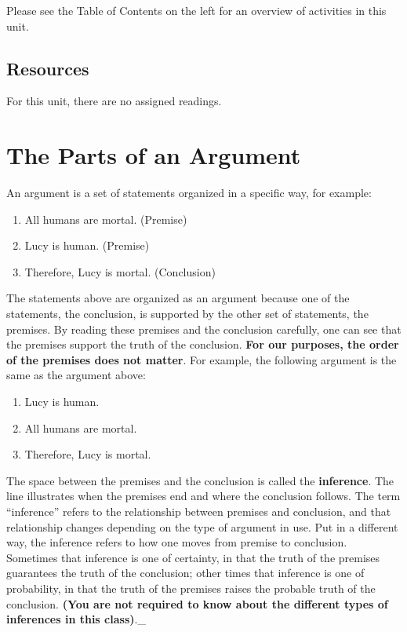 \documentclass[
]{book}
\providecommand{\tightlist}{%
  \setlength{\itemsep}{0pt}\setlength{\parskip}{0pt}}
\begin{document}
Please see the Table of Contents on the left for an overview of activities in this unit.

\hypertarget{resources-1}{%
\subsection*{Resources}\label{resources-1}}

For this unit, there are no assigned readings.

\hypertarget{the-parts-of-an-argument}{%
\section{The Parts of an Argument}\label{the-parts-of-an-argument}}

An argument is a set of statements organized in a specific way, for example:

\begin{enumerate}
\def\labelenumi{\arabic{enumi}.}
\tightlist
\item
  All humans are mortal. (Premise)\\
\item
  Lucy is human. (Premise)\\
\item
  Therefore, Lucy is mortal. (Conclusion)
\end{enumerate}

The statements above are organized as an argument because one of the statements, the conclusion, is supported by the other set of statements, the premises. By reading these premises and the conclusion carefully, one can see that the premises support the truth of the conclusion. \textbf{For our purposes, the order of the premises does not matter}. For example, the following argument is the same as the argument above:

\begin{enumerate}
\def\labelenumi{\arabic{enumi}.}
\tightlist
\item
  Lucy is human.\\
\item
  All humans are mortal.\\
\item
  Therefore, Lucy is mortal.
\end{enumerate}

The space between the premises and the conclusion is called the \textbf{inference}. The line illustrates when the premises end and where the conclusion follows. The term ``inference'' refers to the relationship between premises and conclusion, and that relationship changes depending on the type of argument in use. Put in a different way, the inference refers to how one moves from premise to conclusion. Sometimes that inference is one of certainty, in that the truth of the premises guarantees the truth of the conclusion; other times that inference is one of probability, in that the truth of the premises raises the probable truth of the conclusion. \textbf{(You are not required to know about the different types of inferences in this class)}.\_
\end{document}
